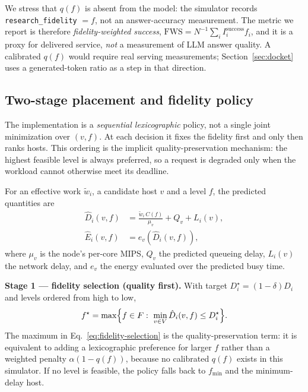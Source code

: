 \documentclass[journal,10pt]{IEEEtran}
\begin{document}
We stress that $q(f)$ is absent from the model: the simulator records
\texttt{research\_fidelity} $=f$, not an answer-accuracy measurement. The metric
we report is therefore \emph{fidelity-weighted success},
$\mathrm{FWS}=N^{-1}\sum_i I_i^{\mathrm{success}} f_i$, and it is a proxy for
delivered service, \emph{not} a measurement of LLM answer quality. A calibrated
$q(f)$ would require real serving measurements; Section~\ref{sec:docket} uses a
generated-token ratio as a step in that direction.

\subsection{Two-stage placement and fidelity policy}
The implementation is a \emph{sequential lexicographic} policy, not a single
joint minimization over $(v,f)$. At each decision it fixes the fidelity first
and only then ranks hosts. This ordering is the implicit quality-preservation
mechanism: the highest feasible level is always preferred, so a request is
degraded only when the workload cannot otherwise meet its deadline.

For an effective work $\tilde w_i$, a candidate host $v$ and a level $f$, the
predicted quantities are
\begin{align}
  \hat D_i(v,f) &= \frac{\tilde w_i\,C(f)}{\mu_v}+Q_v+L_i(v),
  \label{eq:delay}\\
  \hat E_i(v,f) &= e_v\!\left(\hat D_i(v,f)\right),
\end{align}
where $\mu_v$ is the node's per-core MIPS, $Q_v$ the predicted queueing delay,
$L_i(v)$ the network delay, and $e_v$ the energy evaluated over the predicted
busy time.

\textbf{Stage 1 --- fidelity selection (quality first).}
With target $D_i^{\star}=(1-\delta)D_i$ and levels ordered from high to low,
\begin{equation}
  f^{\star}=\max\Bigl\{f\in F:\ \min_{v\in V}\hat D_i(v,f)\le D_i^{\star}\Bigr\}.
  \label{eq:fidelity-selection}
\end{equation}
The maximum in Eq.~\eqref{eq:fidelity-selection} is the quality-preservation
term: it is equivalent to adding a lexicographic preference for larger $f$
rather than a weighted penalty $\alpha(1-q(f))$, because no calibrated $q(f)$
exists in this simulator. If no level is feasible, the policy falls back to
$f_{\min}$ and the minimum-delay host.
\end{document}
